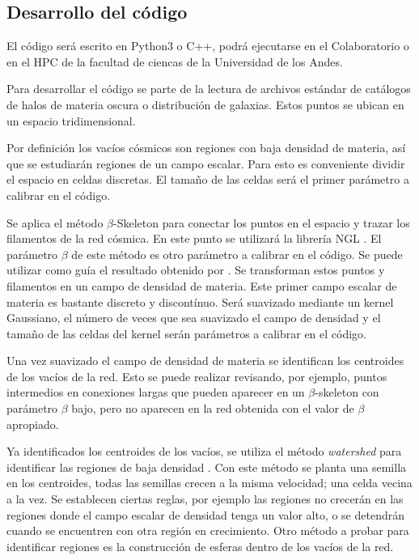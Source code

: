 \documentclass[preprint]{aastex62}
\begin{document}
  \subsection{Desarrollo del código}

  El código será escrito en Python3 o C++, podrá ejecutarse en el Colaboratorio o en el HPC de la
  facultad de ciencas de la Universidad de los Andes.
  
  Para desarrollar el código se parte de la lectura de archivos estándar de catálogos de halos
  de materia oscura o distribución de galaxias. Estos puntos se ubican en un espacio tridimensional.

  Por definición los vacíos cósmicos son regiones con baja densidad de materia, así que se
  estudiarán regiones de un campo escalar. Para esto es conveniente dividir el espacio en
  celdas discretas. El tamaño de las celdas será el primer parámetro a calibrar en el código.
  
  Se aplica el método $\beta$-Skeleton para conectar los puntos en el espacio y trazar los
  filamentos de la red cósmica. En este punto se utilizará la librería NGL \citep{ngl}.
  El parámetro $\beta$ de este método es otro parámetro a calibrar en el código. Se puede
  utilizar como guía el resultado obtenido por \citet{Fang2018}.
  Se transforman estos puntos y filamentos en un campo de densidad de materia. Este primer
  campo escalar de materia es bastante discreto y discontínuo. Será suavizado mediante un
  kernel Gaussiano, el número de veces que sea suavizado el campo de densidad y el tamaño de
  las celdas del kernel serán parámetros a calibrar en el código.

  Una vez suavizado el campo de densidad de materia se identifican los centroides
  de los vacíos de la red. Esto se puede realizar revisando, por ejemplo, puntos intermedios
  en conexiones largas que pueden aparecer en un $\beta$-skeleton con parámetro $\beta$ bajo,
  pero no aparecen en la red obtenida con el valor de $\beta$ apropiado.

  Ya identificados los centroides de los vacíos, se utiliza el método \textit{watershed}
  para identificar las regiones de baja densidad \citep{Sutter2015}. Con este método
  se planta una semilla en los centroides, todas las semillas crecen a la misma velocidad; una
  celda vecina a la vez. Se establecen ciertas reglas, por ejemplo las regiones no crecerán en
  las regiones donde el campo escalar de densidad tenga un valor alto, o se detendrán cuando
  se encuentren con otra región en crecimiento. Otro método a probar para identificar regiones
  es la construcción de esferas dentro de los vacíos de la red. 
\end{document}
